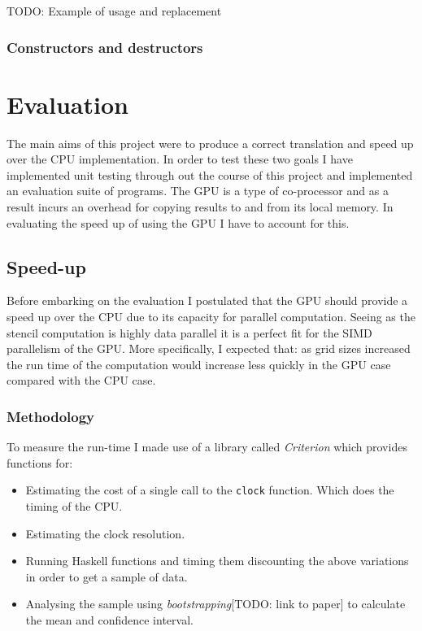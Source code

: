 TODO: Example of usage and replacement

\subsubsection{Constructors and destructors}

\section{Evaluation}

The main aims of this project were to produce a correct translation and
speed up over the CPU implementation. In order to test these two goals I
have implemented unit testing through out the course of this project and
implemented an evaluation suite of programs. The GPU is a type of
co-processor and as a result incurs an overhead for copying results to
and from its local memory. In evaluating the speed up of using the GPU I
have to account for this.

\subsection{Speed-up}

Before embarking on the evaluation I postulated that the GPU should
provide a speed up over the CPU due to its capacity for parallel
computation. Seeing as the stencil computation is highly data parallel
it is a perfect fit for the SIMD parallelism of the GPU. More
specifically, I expected that: as grid sizes increased the run time of
the computation would increase less quickly in the GPU case compared
with the CPU case.

\subsubsection{Methodology}

To measure the run-time I made use of a library called \emph{Criterion}
which provides functions for:

\begin{itemize}
\itemsep1pt\parskip0pt
\item
  Estimating the cost of a single call to the \texttt{clock} function.
  Which does the timing of the CPU.
\item
  Estimating the clock resolution.
\item
  Running Haskell functions and timing them discounting the above
  variations in order to get a sample of data.
\item
  Analysing the sample using \emph{bootstrapping}{[}TODO: link to
  paper{]} to calculate the mean and confidence interval.
\end{itemize}

